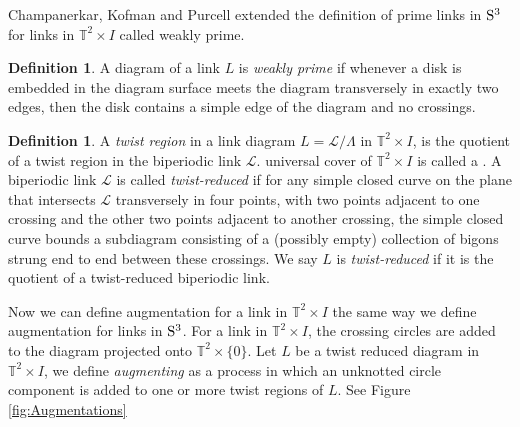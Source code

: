 \documentclass[11pt]{amsart}
\newcommand{\Sp}{{\rm{S}}}
\newcommand{\torus}{{\mathbb{T}^2}}
\theoremstyle{plain}
\theoremstyle{definition}
\newtheorem{define}[theorem]{Definition}
\begin{document}
Champanerkar, Kofman and Purcell \cite{CKP2} extended the definition of prime links in $\Sp^3$ for links in $\torus \times I$ called weakly prime. 

 \begin{define} \label{def:weaklyprime}
	 A diagram of a link $L$ is \emph{weakly prime} if whenever a disk is embedded in the diagram surface meets the diagram transversely in exactly two edges, then the disk contains a simple edge of the diagram and no crossings.
\end{define}


\begin{define}
A \emph{twist region} in a link diagram $L=\mathcal{L}/\Lambda$ in $\torus
\times I$, is the quotient of a twist region in the biperiodic link
$\mathcal{L}$. %
universal cover of $\torus \times I$ is called a .  A biperiodic link
$\mathcal{L}$ is called \emph{twist-reduced} if for any simple closed curve on
the plane that intersects $\mathcal{L}$ transversely in four points, with two
points adjacent to one crossing and the other two points adjacent to another
crossing, the simple closed curve bounds a subdiagram consisting of a (possibly
empty) collection of bigons strung end to end between these crossings. We say
$L$ is \emph{twist-reduced} if it is the quotient of a twist-reduced biperiodic
link.  \end{define}

Now we can define augmentation for a link in $\torus \times I$ the same way we
define augmentation for links in $\Sp^3$. For a link in $\torus \times I$, the
crossing circles are added to the diagram projected onto $\torus \times \{0\}$.
Let $L$ be a twist reduced diagram in $\torus \times I$, we define
\emph{augmenting} as a process in which an unknotted circle component is added
to one or more twist regions of $L$. See Figure \ref{fig:Augmentations}
\end{document}
